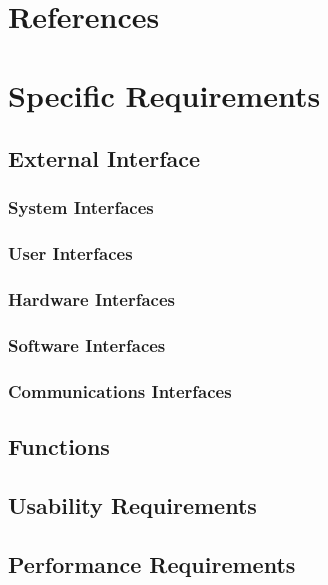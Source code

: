\documentclass[ 10pt]{report}
\begin{document}
    \chapter{References}
    \pagebreak

    \chapter{Specific Requirements}
        \section{External Interface}
            \subsection{System Interfaces}
            \subsection{User Interfaces}
            \subsection{Hardware Interfaces}
            \subsection{Software Interfaces}
            \subsection{Communications Interfaces}
        \section{Functions}
        \section{Usability Requirements}
        \section{Performance Requirements}
\end{document}
